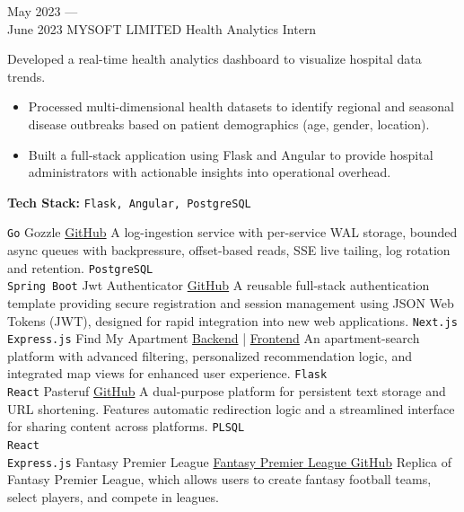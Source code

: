 \documentclass[9pt]{developercv}
\begin{document}
\begin{entrylist}
	\entry
        {May 2023 --- \\ June 2023}
		{MYSOFT LIMITED}
		{Health Analytics Intern}
		{Developed a real-time health analytics dashboard to visualize hospital data trends.
        \begin{itemize}\setlength\itemsep{0.05em}
            \item Processed multi-dimensional health datasets to identify regional and seasonal disease outbreaks based on patient demographics (age, gender, location).
            \item Built a full-stack application using Flask and Angular to provide hospital administrators with actionable insights into operational overhead.
        \end{itemize}
		\vspace{2pt}\noindent\textbf{Tech Stack:} \texttt{Flask, Angular, PostgreSQL}}
\end{entrylist}

\begin{entrylist}
    \entry
		{\texttt{Go}}
		{Gozzle}
		{{\href{https://github.com/mortytheplatypus/gozzle}{GitHub}}}
		{A log-ingestion service with per-service WAL storage, bounded async queues with backpressure, offset-based reads, SSE live tailing, log rotation and retention.}
    \entry
		{\texttt{PostgreSQL} \\ \texttt{Spring Boot}}
		{Jwt Authenticator}
		{{\href{https://github.com/mortytheplatypus/jwt-authenticator}{GitHub}}}
		{A reusable full-stack authentication template providing secure registration and session management using JSON Web Tokens (JWT), designed for rapid integration into new web applications.}
    \entry
		{\texttt{Next.js} \\ \texttt{Express.js}}
		{Find My Apartment}
		{{\href{https://github.com/mortytheplatypus/find-my-apartment-api}{Backend}} | {\href{https://github.com/mortytheplatypus/find-my-apartment-frontend}{Frontend}}}
		{An apartment-search platform with advanced filtering, personalized recommendation logic, and integrated map views for enhanced user experience.}
    \entry
		{\texttt{Flask} \\ \texttt{React}}
		{Pasteruf}
		{{\href{https://github.com/mortytheplatypus/pasteruf-backend}{GitHub}}}
		{A dual-purpose platform for persistent text storage and URL shortening. Features automatic redirection logic and a streamlined interface for sharing content across platforms.}
    \entry
		{\texttt{PLSQL} \\ \texttt{React} \\ \texttt{Express.js}}
		{Fantasy Premier League}
		{\href{https://github.com/mortytheplatypus/FantasyPremierLeagueCSE216}{Fantasy Premier League GitHub}}
		{Replica of Fantasy Premier League, which allows users to create fantasy football teams, select players, and compete in leagues.}
    
\end{entrylist}
\end{document}
